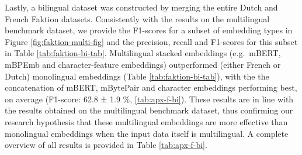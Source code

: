 \documentclass[12pt,a4paper,]{book}
\begin{document}
Lastly, a bilingual dataset was constructed by merging the entire Dutch and French Faktion datasets. Consistently with the results on the multilingual benchmark dataset, we provide the F1-scores for a subset of embedding types in Figure \ref{fig:faktion-multi-fig} and the precision, recall and F1-scores for this subset in Table \ref{tab:faktion-bi-tab}. Multilingual stacked embeddings (e.g.~mBERT, mBPEmb and character-feature embeddings) outperformed (either French or Dutch) monolingual embeddings (Table \ref{tab:faktion-bi-tab}), with the the concatenation of mBERT, mBytePair and character embeddings performing best, on average (F1-score: 62.8 ± 1.9 \%, \ref{tab:apx-f-bi}). These results are in line with the results obtained on the multilingual benchmark dataset, thus confirming our research hypothesis that these multilingual embeddings are more effective than monolingual embeddings when the input data itself is multilingual. A complete overview of all results is provided in Table \ref{tab:apx-f-bi}.
\end{document}
